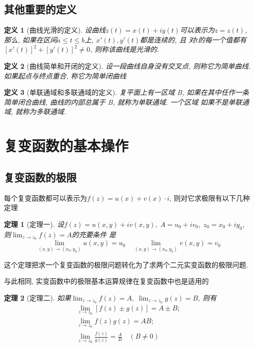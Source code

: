 \documentclass[12pt, a4paper, oneside]{ctexart}
\theoremstyle{plain}
\newtheorem{theorem}{定理}[section]
\newtheorem{definition}{定义}[section]
\theoremstyle{definition}
\theoremstyle{definition}
\begin{document}
\subsection{其他重要的定义}
\begin{definition}[曲线光滑的定义]

    设曲线$z(t)=x(t)+iy(t)$可以表示为$z=z(t)$, 那么, 如果在区间$a\leq t \leq b$上, $x'(t), y'(t)$都是连续的, 且
对$t$的每一个值都有$[x'(t)]^{2}+[y'(t)]^{2}\neq0$, 则称该曲线是光滑的.
\end{definition}


\begin{definition}[曲线简单和开闭的定义]
    设一段曲线自身没有交叉点, 则称它为简单曲线. 如果起点与终点重合, 称它为简单闭曲线
\end{definition}

\begin{definition}[单联通域和多联通域的定义]
    复平面上有一区域 B, 如果在其中任作一条简单闭合曲线, 曲线的内部总属于 B, 就称为单联通域. 一个区域
如果不是单联通域, 就称为多联通域.
\end{definition}

\section{复变函数的基本操作}
\subsection{复变函数的极限}

每个复变函数都可以表示为$f(z)=u(x)+v(x)\cdot i$, 则对它求极限有以下几种定理

\begin{theorem}[定理一]
    设$f(z)=u(x,y)+iv(x,y),\; A=u_{0}+iv_{0},\; z_{0}=x_{0}+iy_{0}$, 则$\lim_{z\to z_{0}}f(z)=A$的充要条件
    是
    \[
        \lim_{ (x,y)\to(x_{0},y_{0}) } u(x,y)=u_{0} \quad \lim_{(x,y)\to(x_{0},y_{0}) }v(x,y)=v_{0}
    \]
\end{theorem}

这个定理把求一个复变函数的极限问题转化为了求两个二元实变函数的极限问题.

与此相同, 实变函数中的极限基本运算规律在复变函数中也是适用的
\begin{theorem}[定理二]
    如果$\lim_{z\to z_{0}}f(z)=A,\;\lim_{z\to z_{0}}g(z)=B$, 则有
    \begin{align}
        \lim_{z\to z_{0}} [f(z)\pm g(z)] = A \pm B; \\
        \lim_{z\to z_{0}} f(z)g(z)=AB;\\
        \lim_{z\to z_{0}} \frac{f(z)}{g(z)}=\frac{A}{B} \quad (B\neq0)
    \end{align}   

\end{theorem}
\end{document}
